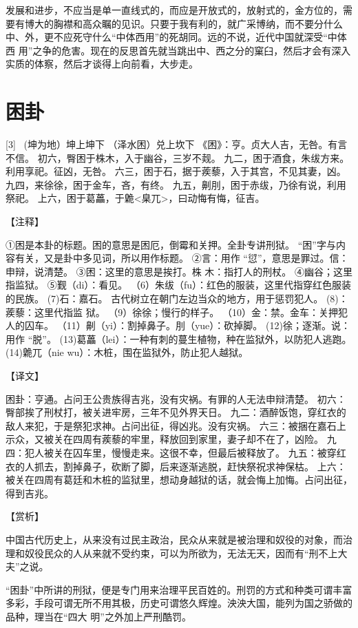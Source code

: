\documentclass[12pt,UTF8]{ctexbook}
\begin{document}
发展和进步，不应当是单一直线式的，而应是开放式的，放射式的，金方位的，需要有博大的胸襟和高众瞩的见识。只要于我有利的，就广采博纳，而不要分什么中、外，更不应死守什么“中体西用”的死胡同。远的不说，近代中国就深受“中体西 用”之争的危害。现在的反思首先就当跳出中、西之分的窠臼，然后才会有深入实质的体察，然后才谈得上向前看，大步走。

\chapter{困卦}
[3] \ (坤为地）坤上坤下
（泽水困）兑上坎下
《困》：亨。贞大人吉，无咎。有言不信。
初六，臀困于株木，入于幽谷，三岁不觌。
九二，困于酒食，朱绂方来。利用享祀。征凶，无咎。
六三，困于石，据于蒺藜，入于其宫，不见其妻，凶。
九四，来徐徐，困于金车，吝，有终。
九五，劓刖，困于赤绂，乃徐有说，利用祭祀。
上六，困于葛藟，于臲<臬兀>，曰动悔有悔，征吉。

【注释】

①困是本卦的标题。困的意思是困厄，倒霉和关押。全卦专讲刑狱。 “困”字与内容有关，又是卦中多见词，所以用作标题。
②言：用作 “愆”，意思是罪过。信：申辩，说清楚。
③困：这里的意思是挨打。株 木：指打人的刑杖。
④幽谷；这里指监狱。
⑤觐（di）：看见。
（6）朱绂（fu）：红色的服装，这里代指穿红色服装的民族。
(7)石：嘉石。 古代树立在朝门左边当众的地方，用于惩罚犯人。
(8)：蒺藜：这里代指监 狱。
（9）徐徐；慢行的样子。
（10）金：禁。金车：关押犯人的囚车。
（11）劓（yi）：割掉鼻子。刖（yue）：砍掉脚。
(12)徐；逐渐。说：用作 “脱”。
(13)葛藟（lei）：一种有刺的蔓生植物，种在监狱外，以防犯人逃跑。
(14)臲兀（nie wu）：木桩，围在监狱外，防止犯人越狱。

【译文】

困卦：亨通。占问王公贵族得吉兆，没有灾祸。有罪的人无法申辩清楚。
初六：臀部挨了刑杖打，被关进牢房，三年不见外界天日。
九二：酒醉饭饱，穿红衣的敌人来犯，于是祭犯求神。占问出征，得凶兆。没有灾祸。
六三：被捆在嘉石上示众，又被关在四周有蒺藜的牢里，释放回到家里，妻子却不在了，凶险。
九四：犯人被关在囚车里，慢慢走来。这很不幸，但最后被释放了。
九五：被穿红衣的人抓去，割掉鼻子，砍断了脚，后来逐渐逃脱，赶快祭祝求神保枯。
上六：被关在四周有葛廷和木桩的监狱里，想动身越狱的话，就会悔上加悔。占问出征，得到吉兆。

【赏析】

中国古代历史上，从来没有过民主政治，民众从来就是被治理和奴役的对象，而治理和奴役民众的人从来就不受约束，可以为所欲为，无法无天，因而有“刑不上大夫”之说。

“困卦”中所讲的刑狱，便是专门用来治理平民百姓的。刑罚的方式和种类可谓丰富多彩，手段可谓无所不用其极，历史可谓悠久辉煌。泱泱大国，能列为国之骄做的品种，理当在“四大 明”之外加上严刑酷罚。
\end{document}
